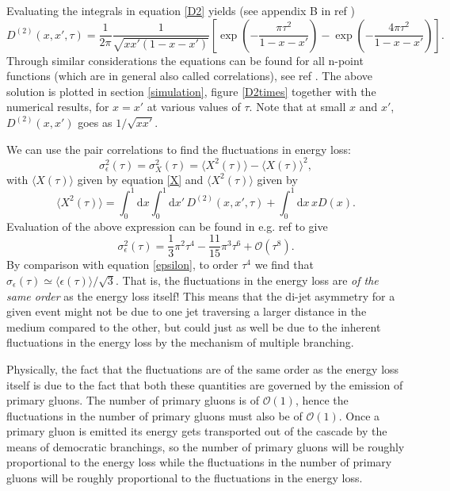 \documentclass[a4paper,12pt]{article}
\numberwithin{equation}{section}
\begin{document}
Evaluating the integrals in equation \eqref{D2} yields (see appendix B in ref \cite{Escobedo:2016jbm})
\begin{equation}\label{D2solution}
D^{(2)}(x,x',\tau)=\frac{1}{2\pi}\frac{1}{\sqrt{xx'(1-x-x')}}\left[ \exp\left({-\frac{\pi \tau^2}{1-x-x'}}\right) -\exp\left({-\frac{4 \pi \tau^2}{1-x-x'}}\right) \right].
\end{equation}
Through similar considerations the equations can be found for all n-point functions (which are in general also called correlations), see ref \cite{KNO}. The above solution is plotted in section \ref{simulation}, figure \ref{D2times} together with the numerical results, for $x=x'$ at various values of $\tau$. Note that at small $x$ and $x'$, $D^{(2)}(x,x')$ goes as $1/\sqrt{xx'}$. 


We can use the pair correlations to find the fluctuations in energy loss:
\begin{equation}
\sigma_\epsilon^2(\tau)=\sigma_X^2(\tau) = \langle X^2(\tau) \rangle - \langle X(\tau)\rangle ^2 ,
\end{equation}
with $\langle X(\tau)\rangle$ given by equation \eqref{X} and $\langle X^2 (\tau)\rangle$ given by
\begin{equation}
\langle X^2(\tau) \rangle =\int_0^1 \mathrm{d}x \int_0^1 \mathrm{d}x'\, D^{(2)}(x,x',\tau)+\int_0^1 \mathrm{d}x\, x D(x).
\end{equation}
Evaluation of the above expression can be found in e.g. ref \cite{Escobedo:2016jbm} to give 
\begin{equation}
\sigma_\epsilon^2(\tau) = \frac{1}{3}\pi^2\tau^4 - \frac{11}{15}\pi^3 \tau^6 + \mathcal{O}(\tau^8).
\end{equation}
By comparison with equation \eqref{epsilon}, to order $\tau^4$ we find that $\sigma_\epsilon(\tau)\simeq \langle \epsilon(\tau)\rangle/\sqrt{3}$. That is, the fluctuations in the energy loss are \emph{of the same order} as the energy loss itself! This means that the di-jet asymmetry for a given event might not be due to one jet traversing a larger distance in the medium compared to the other, but could just as well be due to the inherent fluctuations in the energy loss by the mechanism of multiple branching. 


Physically, the fact that the fluctuations are of the same order as the energy loss itself is due to the fact that both these quantities are governed by the emission of primary gluons. The number of primary gluons is of $\mathcal{O}(1)$, hence the fluctuations in the number of primary gluons must also be of $\mathcal{O}(1)$. Once a primary gluon is emitted its energy gets transported out of the cascade by the means of democratic branchings, so the number of primary gluons will be roughly proportional to the energy loss while the fluctuations in the number of primary gluons will be roughly proportional to the fluctuations in the energy loss.
\end{document}
